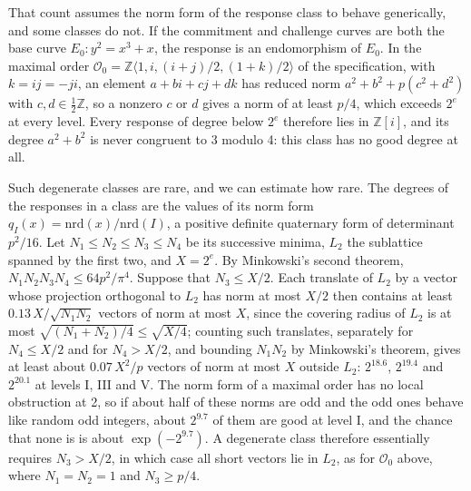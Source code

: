 \documentclass[version=preprint]{iacrcc}
\begin{document}
    That count assumes the norm form of the response class to behave
    generically, and some classes do not. If the commitment and challenge
    curves are both the base curve $E_0 \colon y^2 = x^3 + x$, the response is
    an endomorphism of $E_0$. In the maximal order $\mathcal{O}_0 = \mathbb{Z}\langle
    1, i, (i + j)/2, (1 + k)/2 \rangle$ of the specification, with $k = ij =
    -ji$, an element $a + bi + cj + dk$ has reduced norm $a^2 + b^2 + p(c^2 + d^2)$ with $c, d \in
    \frac{1}{2}\mathbb{Z}$, so a nonzero $c$ or $d$ gives a norm of at least
    $p/4$, which exceeds $2^e$ at every level. Every response of degree below
    $2^e$ therefore lies in $\mathbb{Z}[i]$, and its degree $a^2 + b^2$ is never
    congruent to 3 modulo 4: this class has no good degree at all.

    Such degenerate classes are rare, and we can estimate how rare. The
    degrees of the responses in a class are the values of its norm form
    $q_I(x) = \mathrm{nrd}(x)/\mathrm{nrd}(I)$, a positive definite quaternary
    form of determinant $p^2/16$. Let $N_1 \le N_2 \le N_3 \le N_4$ be its
    successive minima, $L_2$ the sublattice spanned by the first two, and $X =
    2^e$. By Minkowski's second theorem, $N_1 N_2 N_3 N_4 \le 64p^2/\pi^4$.
    Suppose that $N_3 \le X/2$. Each translate of $L_2$ by a vector whose
    projection orthogonal to $L_2$ has norm at most $X/2$ then contains at
    least $0.13\,X/\sqrt{N_1 N_2}$ vectors of norm at most $X$, since the
    covering radius of $L_2$ is at most $\sqrt{(N_1 + N_2)/4} \le
    \sqrt{X/4}$; counting such translates, separately for $N_4 \le X/2$ and
    for $N_4 > X/2$, and bounding $N_1 N_2$ by Minkowski's theorem, gives at
    least about $0.07\,X^2/p$ vectors of norm at most $X$ outside $L_2$:
    $2^{18.6}$, $2^{19.4}$ and $2^{20.1}$ at levels I, III and V. The norm
    form of a maximal order has no local obstruction at 2, so if about half
    of these norms are odd and the odd ones behave like random odd integers,
    about $2^{9.7}$ of them are good at level I, and the chance that none is is about $\exp(-2^{9.7})$. A degenerate class
    therefore essentially requires $N_3 > X/2$, in which case all short
    vectors lie in $L_2$, as for $\mathcal{O}_0$ above, where $N_1 = N_2 =
    1$ and $N_3 \ge p/4$.
\end{document}
